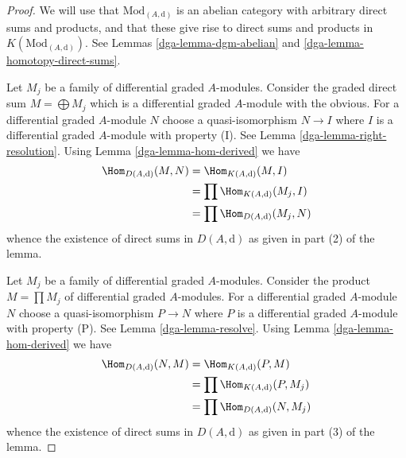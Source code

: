 \begin{proof}

We will use that $\text{Mod}_{(A, \text{d})}$ is an abelian category
with arbitrary direct sums and products, and that these give rise
to direct sums and products in $K(\text{Mod}_{(A, \text{d})})$.
See Lemmas \ref{dga-lemma-dgm-abelian} and \ref{dga-lemma-homotopy-direct-sums}.

\medskip\noindent
Let $M_j$ be a family of differential graded $A$-modules.
Consider the graded direct sum $M = \bigoplus M_j$ which is a
differential graded $A$-module with the obvious.
For a differential graded $A$-module $N$ choose a quasi-isomorphism
$N \to I$ where $I$ is a differential graded $A$-module with property (I).
See Lemma \ref{dga-lemma-right-resolution}.
Using Lemma \ref{dga-lemma-hom-derived} we have
\begin{align*}
\Hom_{D(A, \text{d})}(M, N)
& =
\Hom_{K(A, \text{d})}(M, I) \\
& =
\prod \Hom_{K(A, \text{d})}(M_j, I) \\
& =
\prod \Hom_{D(A, \text{d})}(M_j, N)
\end{align*}
whence the existence of direct sums in $D(A, \text{d})$ as given in
part (2) of the lemma.

\medskip\noindent
Let $M_j$ be a family of differential graded $A$-modules.
Consider the product $M = \prod M_j$ of differential graded $A$-modules.
For a differential graded $A$-module $N$ choose a quasi-isomorphism
$P \to N$ where $P$ is a differential graded $A$-module with property (P).
See Lemma \ref{dga-lemma-resolve}.
Using Lemma \ref{dga-lemma-hom-derived} we have
\begin{align*}
\Hom_{D(A, \text{d})}(N, M)
& =
\Hom_{K(A, \text{d})}(P, M) \\
& =
\prod \Hom_{K(A, \text{d})}(P, M_j) \\
& =
\prod \Hom_{D(A, \text{d})}(N, M_j)
\end{align*}
whence the existence of direct sums in $D(A, \text{d})$ as given in
part (3) of the lemma.
\end{proof}

